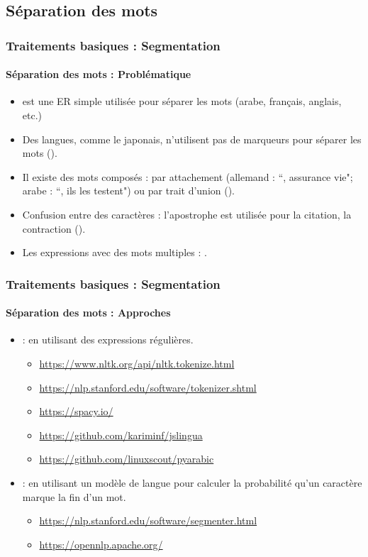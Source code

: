 \documentclass[xcolor=table]{beamer}
\begin{document}
\subsection{Séparation des mots}

\begin{frame}
\frametitle{Traitements basiques : Segmentation}
\framesubtitle{Séparation des mots : Problématique}


\begin{itemize}
	\item \expword{/[ ]+/} est une ER simple utilisée pour séparer les mots (arabe, français, anglais, etc.)
	\item Des langues, comme le japonais, n'utilisent pas de marqueurs pour séparer les mots ().
	\item Il existe des mots composés : par attachement (allemand : ``, assurance vie"; arabe : ``, ils les testent") ou par trait d'union ().
	\item Confusion entre des caractères : l'apostrophe est utilisée pour la citation, la contraction ().
	\item Les expressions avec des mots multiples : .
\end{itemize}

\end{frame}

\begin{frame}
\frametitle{Traitements basiques : Segmentation}
\framesubtitle{Séparation des mots : Approches}

\begin{itemize}
	\item {} : en utilisant des expressions régulières.
	\begin{itemize}
		\item \url{https://www.nltk.org/api/nltk.tokenize.html}
		\item \url{https://nlp.stanford.edu/software/tokenizer.shtml}
		\item \url{https://spacy.io/}
		\item \url{https://github.com/kariminf/jslingua}
		\item \url{https://github.com/linuxscout/pyarabic}
	\end{itemize}
	\item {} : en utilisant un modèle de langue pour calculer la probabilité qu'un caractère marque la  fin d'un mot.
	\begin{itemize}
		\item \url{https://nlp.stanford.edu/software/segmenter.html}
		\item \url{https://opennlp.apache.org/}
	\end{itemize}
\end{itemize}

\end{frame}
\end{document}
